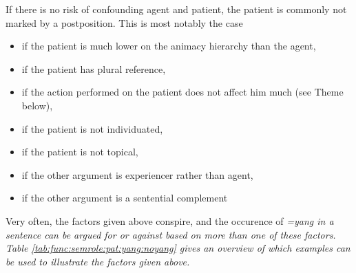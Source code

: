 If there is no risk of confounding agent and patient, the patient is commonly not marked by a postposition. This is most notably the case
\begin{itemize}
 \item if the patient is much lower on the animacy hierarchy than the agent,
 \item if the patient has  plural reference,
 \item if the action performed on the patient does not affect him much (see Theme below),
 \item if the patient is not individuated,
 \item if the patient is not topical,
 \item if the other argument is experiencer rather than agent,
 \item if the other argument is a sentential complement
\end{itemize}

Very often, the factors given above conspire, and the occurence of \em =yang \em in a sentence can be argued for or against based on more than one of these factors. Table \ref{tab:func:semrole:pat:yang:noyang} gives an overview of which examples can be used to illustrate the factors given above.



